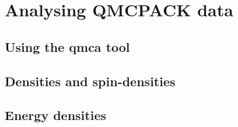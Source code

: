 \chapter{Analysing QMCPACK data}

\section{Using the qmca tool}
\section{Densities and spin-densities}
\section{Energy densities}

